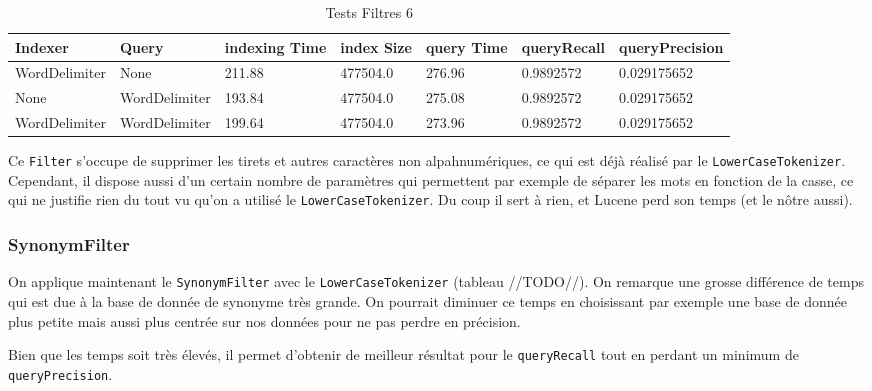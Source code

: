 \begin{table}[!htbp]
    \hspace{-2cm}
                \begin{tabular}{|p{2.1cm}|p{2.1cm}|p{2cm}|p{2cm}|p{2.5cm}|p{2.5cm}|p{2.5cm}|}
                    \hline
                    \textbf{Indexer} & \textbf{Query} & \textbf{indexing Time} & \textbf{index Size} & \textbf{query Time} & \textbf{queryRecall} & \textbf{queryPrecision}\\
                    \hline
WordDelimiter & None & 211.88 & 477504.0 & 276.96 & 0.9892572 & 0.029175652\\
		\hline
None & WordDelimiter & 193.84 & 477504.0 & 275.08 & 0.9892572 & 0.029175652\\
		\hline
WordDelimiter & WordDelimiter & 199.64 & 477504.0 & 273.96 & 0.9892572 & 0.029175652\\
                    \hline
                \end{tabular}
                \caption{Tests Filtres 6}
                \label{tab:tests_filtres_6}
            \end{table}

Ce \texttt{Filter} s’occupe de supprimer les tirets et autres caractères non alpahnumériques, ce qui est déjà réalisé par le \texttt{LowerCaseTokenizer}. Cependant, il dispose aussi d’un certain nombre de paramètres qui permettent par exemple de séparer les mots en fonction de la casse, ce qui ne justifie rien du tout vu qu’on a utilisé le \texttt{LowerCaseTokenizer}. Du coup il sert à rien, et Lucene perd son temps (et le nôtre aussi).

\subsubsection{SynonymFilter}

On applique maintenant le \texttt{SynonymFilter} avec le \texttt{LowerCaseTokenizer} (tableau //TODO//). On remarque une grosse différence de temps qui est due à la base de donnée de synonyme très grande. On pourrait diminuer ce temps en choisissant par exemple une base de donnée plus petite mais aussi plus centrée sur nos données pour ne pas perdre en précision.

Bien que les temps soit très élevés, il permet d’obtenir de meilleur résultat pour le \texttt{queryRecall} tout en perdant un minimum de \texttt{queryPrecision}.

